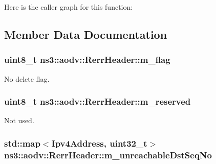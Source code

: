 Here is the caller graph for this function\+:




\subsection{Member Data Documentation}
\subsubsection[{\texorpdfstring{m\+\_\+flag}{m_flag}}]{\setlength{\rightskip}{0pt plus 5cm}uint8\+\_\+t ns3\+::aodv\+::\+Rerr\+Header\+::m\+\_\+flag\hspace{0.3cm}{\ttfamily [private]}}\hypertarget{classns3_1_1aodv_1_1RerrHeader_a5900f88da998f757a35580842ed00fff}{}\label{classns3_1_1aodv_1_1RerrHeader_a5900f88da998f757a35580842ed00fff}


No delete flag. 

\subsubsection[{\texorpdfstring{m\+\_\+reserved}{m_reserved}}]{\setlength{\rightskip}{0pt plus 5cm}uint8\+\_\+t ns3\+::aodv\+::\+Rerr\+Header\+::m\+\_\+reserved\hspace{0.3cm}{\ttfamily [private]}}\hypertarget{classns3_1_1aodv_1_1RerrHeader_a33e4820f7cd4d2bac9ec3776e6edaeb3}{}\label{classns3_1_1aodv_1_1RerrHeader_a33e4820f7cd4d2bac9ec3776e6edaeb3}


Not used. 

\subsubsection[{\texorpdfstring{m\+\_\+unreachable\+Dst\+Seq\+No}{m_unreachableDstSeqNo}}]{\setlength{\rightskip}{0pt plus 5cm}std\+::map$<${\bf Ipv4\+Address}, uint32\+\_\+t$>$ ns3\+::aodv\+::\+Rerr\+Header\+::m\+\_\+unreachable\+Dst\+Seq\+No\hspace{0.3cm}{\ttfamily [private]}}\hypertarget{classns3_1_1aodv_1_1RerrHeader_aac0c151289da2fbe168bf5550c492bd5}{}\label{classns3_1_1aodv_1_1RerrHeader_aac0c151289da2fbe168bf5550c492bd5}


